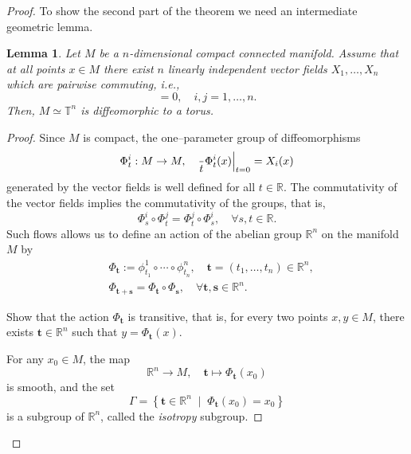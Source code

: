 \documentclass[english,fontsize=11pt,paper=a5,oneside]{scrbook}
\newcommand{\R}{\mathbb{R}}
\newcommand{\T}{\mathbb{T}}
\let\d\relax
\newcommand{\d}{\mathrm{d}}
\newtheorem{lemma}[theorem]{Lemma}
\theoremstyle{definition}
\newenvironment{exercise}
  {\pushQED{\qed}\renewcommand{\qedsymbol}{$\maltese$}\exercisex}
  {\popQED\endexercisex}
\begin{document}
\begin{proof}
  To show the second part of the theorem we need an intermediate geometric lemma.
  \begin{lemma}\label{lemma:isotn}
    Let $M$ be a $n$-dimensional compact connected manifold.
    Assume that at all points $x\in M$ there exist $n$ linearly independent vector fields $X_1, \ldots, X_n$ which are pairwise commuting, i.e.,
    \begin{equation}
      [X_i, X_j] = 0, \quad i,j = 1,\ldots,n.
    \end{equation}
    Then, $M \simeq \T^n$ is diffeomorphic to a torus.
  \end{lemma}
  \begin{proof}
    Since $M$ is compact, the one--parameter group of diffeomorphisms
    \begin{equation}
      \Phi_t^i: M \to M, \quad \frac{\d}{\d t} \Phi_t^i(x)\Big|_{t=0} = X_i(x)
    \end{equation}
    generated by the vector fields is well defined for all $t\in\R$.
    The commutativity of the vector fields implies the commutativity of the groups, that is,
    \begin{equation}
      \Phi^i_s \circ \Phi^j_t = \Phi^j_t \circ \Phi^i_s, \quad \forall s,t\in\R.
    \end{equation}
    Such flows allows us to define an action of the abelian group $\R^n$ on the manifold $M$ by
    \begin{align}
       & \Phi_{\bm{t}} := \phi_{t_1}^1 \circ \cdots \circ \phi_{t_n}^n, \quad \bm{t} = (t_1, \ldots, t_n)\in \R^n, \\
       & \Phi_{\bm t + \bm s} = \Phi_{\bm t} \circ \Phi_{\bm s}, \quad \forall \bm t, \bm s \in \R^n.
    \end{align}

    \begin{exercise}
      Show that the action $\Phi_{\bm t}$ is transitive, that is, for every two points $x, y\in M$, there exists $\bm t\in\R^n$ such that $y = \Phi_{\bm t} (x)$.
    \end{exercise}

    For any $x_0 \in M$, the map
    \begin{equation}\label{eq:diffeoRnM}
      \R^n \to M, \quad \bm t \mapsto \Phi_{\bm t}(x_0)
    \end{equation}
    is smooth, and the set
    \begin{equation}
      \Gamma = \left\{ \bm t \in \R^n \;\mid\; \Phi_{\bm t}(x_0) = x_0\right\}
    \end{equation}
    is a subgroup of $\R^n$, called the \emph{isotropy} subgroup.


\end{proof}
\end{proof}
\end{document}
